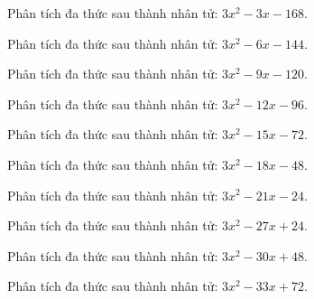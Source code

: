 \begin{bt}
	Phân tích đa thức sau thành nhân tử: $3 x^2 - 3 x - 168$.
\end{bt}
\begin{bt}
	Phân tích đa thức sau thành nhân tử: $3 x^2 - 6 x - 144$.
\end{bt}
\begin{bt}
	Phân tích đa thức sau thành nhân tử: $3 x^2 - 9 x - 120$.
\end{bt}
\begin{bt}
	Phân tích đa thức sau thành nhân tử: $3 x^2 - 12 x - 96$.
\end{bt}
\begin{bt}
	Phân tích đa thức sau thành nhân tử: $3 x^2 - 15 x - 72$.
\end{bt}
\begin{bt}
	Phân tích đa thức sau thành nhân tử: $3 x^2 - 18 x - 48$.
\end{bt}
\begin{bt}
	Phân tích đa thức sau thành nhân tử: $3 x^2 - 21 x - 24$.
\end{bt}
\begin{bt}
	Phân tích đa thức sau thành nhân tử: $3 x^2 - 27 x + 24$.
\end{bt}
\begin{bt}
	Phân tích đa thức sau thành nhân tử: $3 x^2 - 30 x + 48$.
\end{bt}
\begin{bt}
	Phân tích đa thức sau thành nhân tử: $3 x^2 - 33 x + 72$.
\end{bt}
